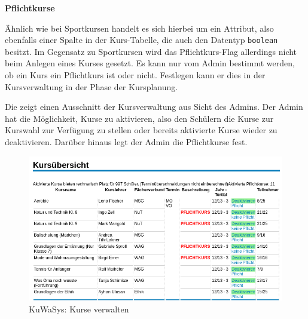 \textbf{Pflichtkurse}

Ähnlich wie bei Sportkursen handelt es sich hierbei um ein Attribut, also ebenfalls einer Spalte in der Kurs-Tabelle, die auch den Datentyp \texttt{boolean} besitzt.
Im Gegensatz zu Sportkursen wird das Pflichtkurs-Flag allerdings nicht beim Anlegen eines Kurses gesetzt. Es kann nur vom Admin bestimmt werden, ob ein Kurs ein Pflichtkurs ist oder nicht. Festlegen kann er dies in der Kursverwaltung in der Phase der Kursplanung.

Die  zeigt einen Ausschnitt der Kursverwaltung aus Sicht des Admins.
Der Admin hat die Möglichkeit, Kurse zu aktivieren, also den Schülern die Kurse zur Kurswahl zur Verfügung zu stellen oder bereits aktivierte Kurse wieder zu deaktivieren.
Darüber hinaus legt der Admin die Pflichtkurse fest.

\begin{figure}[H]
 \begin{center}
   \includegraphics[scale=0.6]{img/KursVerwalten_KuWaSys.png}
 \end{center}
 \caption[\textbf{KuWaSys: Kurse verwalten}]{KuWaSys: Kurse verwalten}
 \label{fig:KursVerwalten_KuWaSys}
\end{figure}

